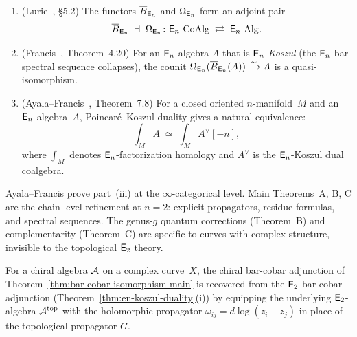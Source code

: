 \begin{theorem}
\label{thm:en-koszul-duality}
\begin{enumerate}[label=\textup{(\roman*)}]
\item \textup{(Lurie~\cite{HA}, \S5.2)}\quad
  The functors $\overline{B}_{\mathsf{E}_n}$ and $\Omega_{\mathsf{E}_n}$ form an adjoint pair
  \[
  \overline{B}_{\mathsf{E}_n}
  \;\dashv\;
  \Omega_{\mathsf{E}_n}
  \colon
  \mathsf{E}_n\text{-}\mathrm{CoAlg}
  \;\rightleftarrows\;
  \mathsf{E}_n\text{-}\mathrm{Alg}.
  \]
\item \textup{(Francis~\cite{Francis2013}, Theorem~4.20)}\quad
  For an $\mathsf{E}_n$-algebra $A$ that is \emph{$\mathsf{E}_n$-Koszul}
  \textup{(}the $\mathsf{E}_n$ bar spectral sequence collapses\textup{)},
  the counit
  $\Omega_{\mathsf{E}_n}(\overline{B}_{\mathsf{E}_n}(A)) \xrightarrow{\sim} A$
  is a quasi-isomorphism.
\item \textup{(Ayala--Francis~\cite{AF15}, Theorem~7.8)}\quad
  For a closed oriented $n$-manifold~$M$ and an $\mathsf{E}_n$-algebra~$A$,
  Poincar\'e--Koszul duality gives a natural equivalence:
  \begin{equation}\label{eq:poincare-koszul}
  \int_M A
  \;\simeq\;
  \int_M A^\vee[-n],
  \end{equation}
  where $\int_M$ denotes $\mathsf{E}_n$-factorization homology and $A^\vee$
  is the $\mathsf{E}_n$-Koszul dual coalgebra.
\end{enumerate}
\end{theorem}

\begin{remark}
\label{rem:chain-level-en}
Ayala--Francis prove part~(iii) at the $\infty$-categorical level.
Main Theorems~A, B, C are the chain-level refinement at $n = 2$:
explicit propagators, residue formulas, and spectral sequences.
The genus-$g$ quantum corrections (Theorem~B) and complementarity
(Theorem~C) are specific to curves with complex structure, invisible
to the topological $\mathsf{E}_2$ theory.
\end{remark}

\begin{corollary}[Recovery of chiral bar-cobar at \texorpdfstring{$n = 2$}{n = 2};
\ClaimStatusProvedHere]
\label{cor:n2-recovery}
For a chiral algebra $\mathcal{A}$ on a complex curve~$X$, the chiral
bar-cobar adjunction of
Theorem~\textup{\ref{thm:bar-cobar-isomorphism-main}} is recovered
from the $\mathsf{E}_2$ bar-cobar adjunction
\textup{(}Theorem~\textup{\ref{thm:en-koszul-duality}(i))} by
equipping the underlying $\mathsf{E}_2$-algebra $\mathcal{A}^{\mathrm{top}}$ with
the holomorphic propagator $\omega_{ij} = d\log(z_i - z_j)$ in
place of the topological propagator $G$.
\end{corollary}

